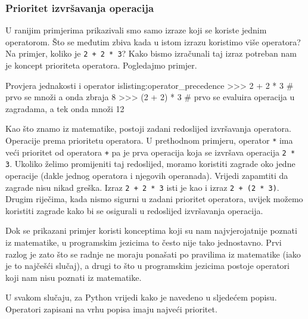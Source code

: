 \subsubsection{Prioritet izvršavanja operacija}

U ranijim primjerima prikazivali smo samo izraze koji se koriste jednim operatorom. Što se međutim zbiva kada u istom izrazu koristimo više operatora? Na primjer, koliko je \texttt{2 + 2 * 3}? Kako bismo izračunali taj izraz potreban nam je koncept prioriteta operatora{}. Pogledajmo primjer.

\begin{python}{Provjera jednakosti i operator is}{listing:operator_precedence}
>>> 2 + 2 * 3  # prvo se množi a onda zbraja
8
>>> (2 + 2) * 3  # prvo se evaluira operacija u zagradama, a tek onda množi
12
\end{python}

Kao što znamo iz matematike, postoji zadani redoslijed izvršavanja operatora. Operacije prema prioritetu operatora. U prethodnom primjeru, operator \texttt{*} ima veći prioritet od operatora \texttt{+} pa je prva operacija koja se izvršava operacija \texttt{2 * 3}. Ukoliko želimo promijeniti taj redoslijed, moramo koristiti zagrade oko jedne operacije (dakle jednog operatora i njegovih operanada). Vrijedi zapamtiti da zagrade nisu nikad greška. Izraz \texttt{2 + 2 * 3} isti je kao i izraz \texttt{2 + (2 * 3)}. Drugim riječima, kada nismo sigurni u zadani prioritet operatora, uvijek možemo koristiti zagrade kako bi se osigurali u redoslijed izvršavanja operacija.

Dok se prikazani primjer koristi konceptima koji su nam najvjerojatnije poznati iz matematike, u programskim jezicima to često nije tako jednostavno. Prvi razlog je zato što se radnje ne moraju ponašati po pravilima iz matematike (iako je to najčešći slučaj), a drugi to što u programskim jezicima postoje operatori koji nam nisu poznati iz matematike.

U svakom slučaju, za Python vrijedi kako je navedeno u sljedećem popisu. Operatori zapisani na vrhu popisa imaju najveći prioritet.


